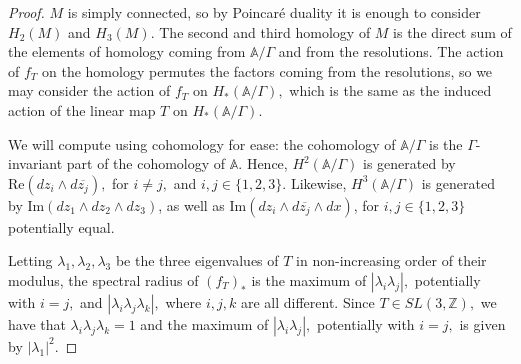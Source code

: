 \documentclass[10pt,a4paper]{amsart}
\begin{document}
\begin{proof}
    $M$ is simply connected, so by Poincar\'e duality it is enough to consider $H_2(M)$ and $H_3(M).$ The second and third homology of $M$ is the direct sum of the elements of homology coming from $\mathbb{A}/\Gamma$ and from the resolutions. The action of $f_T$ on the homology permutes the factors coming from the resolutions, so we may consider the action of $f_T$ on $H_*(\mathbb{A}/\Gamma),$ which is the same as the induced action of the linear map $T$ on $H_*(\mathbb{A}/\Gamma).$

    We will compute using cohomology for ease: the cohomology of $\mathbb{A}/\Gamma$ is the $\Gamma$-invariant part of the cohomology of $\mathbb{A}.$ Hence, $H^2(\mathbb{A}/\Gamma)$ is generated by $\text{Re}(dz_i\wedge d\overline{z_j}),$ for $i\neq j,$ and $i,j\in\{1,2,3\}$. Likewise, $H^3(\mathbb{A}/\Gamma)$ is generated by $\text{Im}(dz_1\wedge dz_2\wedge dz_3)$, as well as $\text{Im}(dz_i\wedge d\overline{z_j}\wedge dx)$, for $i,j\in\{1,2,3\}$ potentially equal.

    Letting $\lambda_1,\lambda_2, \lambda_3$ be the three eigenvalues of $T$ in non-increasing order of their modulus, the spectral radius of $(f_T)_*$ is the maximum of $|\lambda_i\lambda_j|,$ potentially with $i=j,$ and $|\lambda_i\lambda_j\lambda_k|,$ where $i, j, k$ are all different. Since $T\in SL(3, \mathbb{Z}),$ we have that $\lambda_i\lambda_j\lambda_k=1$ and the maximum of $|\lambda_i\lambda_j|,$ potentially with $i=j,$ is given by $|\lambda_1|^2.$   
\end{proof}
\end{document}
